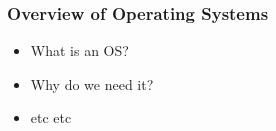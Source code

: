 \begin{frame}
\frametitle{Overview of Operating Systems}
\begin{itemize}
    \item What is an OS?
    \item Why do we need it?
    \item etc etc
\end{itemize}
\end{frame}